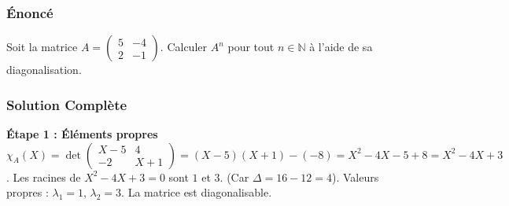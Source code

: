 \documentclass[11pt,a4paper]{article}
\begin{document}
\subsubsection*{Énoncé}
Soit la matrice $A = \begin{pmatrix} 5 & -4 \\ 2 & -1 \end{pmatrix}$.
Calculer $A^n$ pour tout $n \in \mathbb{N}$ à l'aide de sa diagonalisation.

\subsubsection*{Solution Complète}

\textbf{Étape 1 : Éléments propres}
$\chi_A(X) = \det\begin{pmatrix} X-5 & 4 \\ -2 & X+1 \end{pmatrix} = (X-5)(X+1) - (-8) = X^2 - 4X - 5 + 8 = X^2 - 4X + 3$.
Les racines de $X^2 - 4X + 3 = 0$ sont $1$ et $3$. (Car $\Delta = 16 - 12 = 4$).
Valeurs propres : $\lambda_1 = 1$, $\lambda_2 = 3$. La matrice est diagonalisable.
\end{document}
